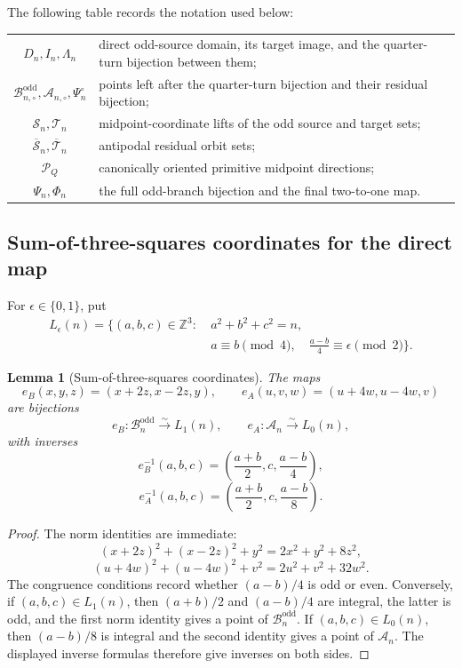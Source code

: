 \documentclass[11pt]{amsart}
\newtheorem{lemma}[theorem]{Lemma}
\theoremstyle{definition}
\theoremstyle{remark}
\newcommand{\Z}{\mathbb Z}
\newcommand{\An}{\mathcal A_n}
\newcommand{\Bodd}{\mathcal B_n^{\mathrm{odd}}}
\newcommand{\Boddres}{\mathcal B_{n,\circ}^{\mathrm{odd}}}
\newcommand{\Ares}{\mathcal A_{n,\circ}}
\newcommand{\Sn}{\mathcal S_n}
\newcommand{\Tn}{\mathcal T_n}
\newcommand{\Sbar}{\overline{\mathcal S}_n}
\newcommand{\Tbar}{\overline{\mathcal T}_n}
\newcommand{\Dcal}{\mathcal P_Q}
\begin{document}
The following table records the notation used below:
\begin{center}
\renewcommand{\arraystretch}{1.12}
\begin{tabular}{@{}c p{}@{}}
$D_n,I_n,\Lambda_n$&direct odd-source domain, its target image, and the
quarter-turn bijection between them;\\
$\Boddres,\Ares,\Psi_n^\circ$&points left after the quarter-turn bijection and their
residual bijection;\\
$\Sn,\Tn$&midpoint-coordinate lifts of the odd source and target sets;\\
$\Sbar,\Tbar$&antipodal residual orbit sets;\\
$\Dcal$&canonically oriented primitive midpoint directions;\\
$\Psi_n,\Phi_n$&the full odd-branch bijection and the final two-to-one map.
\end{tabular}
\end{center}

\subsection{Sum-of-three-squares coordinates for the direct map}
For $\epsilon\in\{0,1\}$, put
\[
 \begin{aligned}
 L_\epsilon(n)=\{(a,b,c)\in\Z^3:
 &\ a^2+b^2+c^2=n,\\
 &\ a\equiv b\pmod4,\quad
 \frac{a-b}{4}\equiv\epsilon\pmod2\}.
 \end{aligned}
\]

\begin{lemma}[Sum-of-three-squares coordinates]\label{lem:pure-coordinates}
The maps
\[
 e_B(x,y,z)=(x+2z,x-2z,y),
 \qquad
 e_A(u,v,w)=(u+4w,u-4w,v)
\]
are bijections
\[
 e_B:\Bodd\xrightarrow{\sim}L_1(n),
 \qquad
 e_A:\An\xrightarrow{\sim}L_0(n),
\]
with inverses
\[
 e_B^{-1}(a,b,c)=\left(\frac{a+b}{2},c,\frac{a-b}{4}\right),
\]
\[
 e_A^{-1}(a,b,c)=\left(\frac{a+b}{2},c,\frac{a-b}{8}\right).
\]
\end{lemma}

\begin{proof}
The norm identities are immediate:
\[
 (x+2z)^2+(x-2z)^2+y^2=2x^2+y^2+8z^2,
\]
\[
 (u+4w)^2+(u-4w)^2+v^2=2u^2+v^2+32w^2.
\]
The congruence conditions record whether $(a-b)/4$ is odd or even.
Conversely, if $(a,b,c)\in L_1(n)$, then $(a+b)/2$ and $(a-b)/4$ are
integral, the latter is odd, and the first norm identity gives a point of
$\Bodd$.  If $(a,b,c)\in L_0(n)$, then $(a-b)/8$ is integral and the second
identity gives a point of $\An$.  The displayed inverse formulas therefore
give inverses on both sides.
\end{proof}
\end{document}
